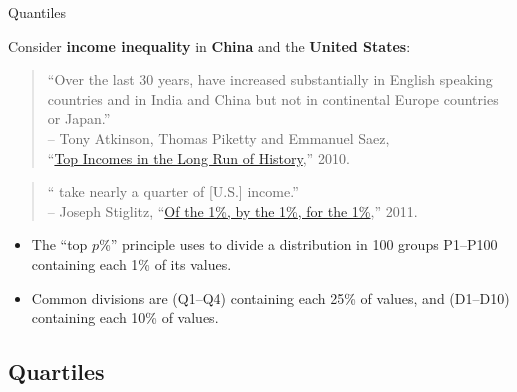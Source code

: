 \documentclass{beamer}
\begin{document}
	\begin{frame}[t]{Quantiles}

	
	Consider \textbf{income inequality} in \textbf{China} and the \textbf{United States}:
	
	\begin{quote}``Over the last 30 years,  have increased substantially in English speaking countries and in India and China but not in continental Europe countries or Japan.''\\[.2em]-- Tony Atkinson, Thomas Piketty and Emmanuel Saez,\\ ``\href{http://piketty.pse.ens.fr/fichiers/public/AtkinsonPikettySaez2010.pdf}{Top Incomes in the Long Run of History},'' 2010.\end{quote}
		
	\begin{quote}`` take nearly a quarter of [U.S.] income.''\\[.2em]-- Joseph Stiglitz, ``\href{http://www.vanityfair.com/society/features/2011/05/top-one-percent-201105}{Of the 1\%, by the 1\%, for the 1\%},'' 2011.\end{quote}
	
	\begin{itemize}
		\item The ``top $p$\%'' principle uses  to divide a distribution in 100 groups P1--P100 containing each 1\% of its values.
		\item Common divisions are  (Q1--Q4) containing each 25\% of values, and  (D1--D10) containing each 10\% of values.
	\end{itemize}

	\end{frame}
	
	

	
	\subsection{Quartiles}
\end{document}
